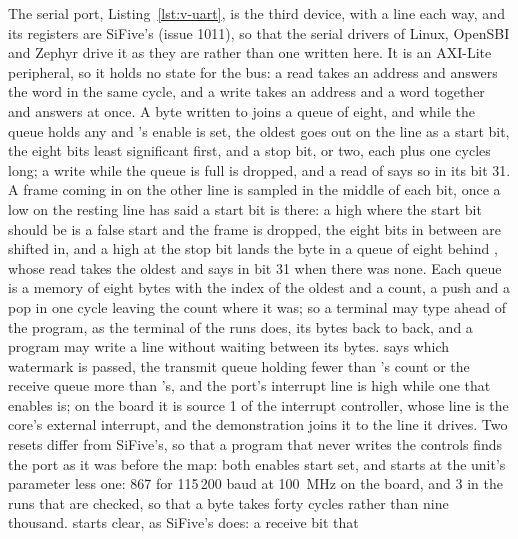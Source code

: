 \documentclass[journal,onecolumn,9pt]{IEEEtran}
\begin{document}




The serial port, Listing~\ref{lst:v-uart}, is the third device,
with a line each way, and its registers are SiFive's
 (issue 1011), so that the serial drivers of Linux,
OpenSBI and Zephyr drive it as they are rather than one written here.
It is an AXI-Lite peripheral, so it holds no state for the bus: a read
takes an address and answers the word in the same cycle, and a write
takes an address and a word together and answers at once. A byte
written to  joins a queue of eight, and while the queue
holds any and 's enable is set, the oldest goes out on
the line as a start bit, the eight bits least significant first, and
a stop bit, or two, each  plus one cycles long; a write
while the queue is full is dropped, and a read of  says
so in its bit 31. A frame coming in on the other line is sampled in
the middle of each bit, once a low on the resting line has said a
start bit is there: a high where the start bit should be is a false
start and the frame is dropped, the eight bits in between are shifted
in, and a high at the stop bit lands the byte in a queue of eight
behind , whose read takes the oldest and says in bit 31
when there was none. Each queue is a memory of eight bytes with the
index of the oldest and a count, a push and a pop in one cycle leaving
the count where it was; so a terminal may type ahead of the program,
as the terminal of the runs does, its bytes back to back, and a
program may write a line without waiting between its bytes.
 says which watermark is passed, the transmit queue holding
fewer than 's count or the receive queue more than
's, and the port's interrupt line is high while one that
 enables is; on the board it is source 1 of the interrupt
controller, whose line is the core's external interrupt, and the
demonstration joins it to the line it drives. Two resets differ from
SiFive's, so that a program that never writes the controls finds the
port as it was before the map: both enables start set, and
 starts at the unit's parameter  less one:
867 for 115\,200 baud at 100~MHz on the board, and 3 in the runs that
are checked, so that a byte takes forty cycles rather than nine
thousand.  starts clear, as SiFive's does: a receive bit that
\end{document}
